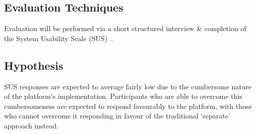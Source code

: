 

\subsection{Evaluation Techniques}
Evaluation will be performed via a short structured interview \& completion of the System Usability Scale (SUS)~\cite{Brooke1996}.


\subsection{Hypothesis}
SUS responses are expected to average fairly low due to the cumbersome nature of the platform's implementation. Participants who are able to overcome this cumbersomeness are expected to respond favourably to the platform, with those who cannot overcome it responding in favour of the traditional `separate' approach instead.


